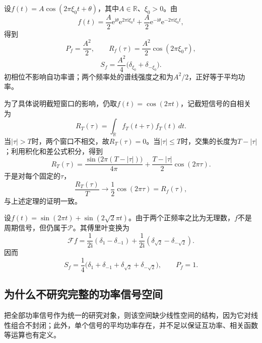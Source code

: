 \begin{example}[单个余弦信号]
    设$f(t)=A\cos(2\pi\xi_0t+\theta)$，其中$A\in\mathbb{R}$、$\xi_0>0$。由
    $$
        f(t)=\frac{A}{2}\mathrm{e}^{\mathrm{i}\theta}
        \mathrm{e}^{2\pi\mathrm{i}\xi_0t}
        +\frac{A}{2}\mathrm{e}^{-\mathrm{i}\theta}
        \mathrm{e}^{-2\pi\mathrm{i}\xi_0t},
    $$
    得到
    $$
        P_f=\frac{A^2}{2},\qquad
        R_f(\tau)=\frac{A^2}{2}\cos(2\pi\xi_0\tau),
    $$
    $$
        S_f=\frac{A^2}{4}
        \bigl(\delta_{\xi_0}+\delta_{-\xi_0}\bigr).
    $$
    初相位不影响自功率谱；两个频率处的谱线强度之和为$A^2/2$，正好等于平均功率。
\end{example}

为了具体说明截短窗口的影响，仍取$f(t)=\cos(2\pi t)$，记截短信号的自相关为
$$
    R_T(\tau)=\int_{\mathbb{R}}f_T(t+\tau)f_T(t)\,dt.
$$
当$|\tau|>T$时，两个窗口不相交，故$R_T(\tau)=0$。当$|\tau|\le T$时，交集的长度为$T-|\tau|$；利用积化和差公式积分，得到
$$
    R_T(\tau)=
    \frac{\sin\bigl(2\pi(T-|\tau|)\bigr)}{4\pi}
    +\frac{T-|\tau|}{2}\cos(2\pi\tau).
$$
于是对每个固定的$\tau$，
$$
    \frac{R_T(\tau)}{T}\longrightarrow
    \frac12\cos(2\pi\tau)=R_f(\tau),
$$
与上述定理的证明一致。

\begin{example}
    设$f(t)=\sin(2\pi t)+\sin(2\sqrt2\pi t)$。由于两个正频率之比为无理数，$f$不是周期信号，但仍属于$\mathcal{P}$。其傅里叶变换为
    $$
        \mathcal{F}f
        =\frac{1}{2\mathrm{i}}(\delta_1-\delta_{-1})
        +\frac{1}{2\mathrm{i}}(\delta_{\sqrt2}-\delta_{-\sqrt2}).
    $$
    因而
    $$
        S_f=\frac14
        \bigl(\delta_1+\delta_{-1}
        +\delta_{\sqrt2}+\delta_{-\sqrt2}\bigr),
        \qquad P_f=1.
    $$
\end{example}

\subsection{为什么不研究完整的功率信号空间}\label{sub:power_signal_scope}

把全部功率信号作为统一的研究对象，则该空间缺少线性空间的结构，因为它对线性组合不封闭；此外，单个信号的平均功率存在，并不足以保证互功率、相关函数等运算也有定义。

